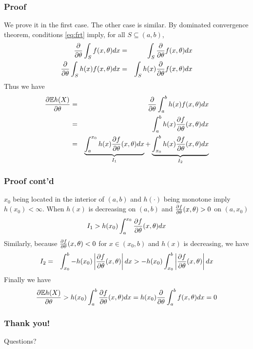 \documentclass{beamer}
\begin{document}
\begin{frame}
  \frametitle{Proof}
  \begin{scriptsize}
    We prove it in the first case. The other case is similar.
    By dominated convergence theorem, conditions \eqref{eq:frt}
    imply, for all $S \subseteq (a, b)$,
    \begin{eqnarray*}
      {\partial \over \partial \theta}\int_S f(x, \theta) dx
      &=&
      \int_S {\partial \over \partial \theta} f(x, \theta) dx \\
          {\partial \over \partial \theta}\int_S h(x) f(x, \theta) dx
          &=&
          \int_S h(x) {\partial \over \partial \theta} f(x, \theta) dx \\
    \end{eqnarray*}
    Thus we have
    \begin{eqnarray*}
      {\partial  \mathbb{E} h(X) \over \partial \theta}
      &=&
      {\partial \over \partial \theta}
      \int_a^b h(x)
      f(x, \theta) dx \\
      &=& \int_a^b h(x)
      {\partial f \over \partial \theta}(x, \theta) dx \\
      &=& \underbrace{\int_a^{x_0}
        h(x) {\partial f \over \partial \theta}(x, \theta) dx}_{I_1}
      + \underbrace{\int_{x_0}^b
        h(x) {\partial f \over \partial \theta}(x,
        \theta) dx}_{I_2}
    \end{eqnarray*}
  \end{scriptsize}
\end{frame}

\begin{frame}
  \frametitle{Proof cont'd}
  \begin{scriptsize}
    $x_0$ being located in the interior of $(a, b)$ and
    $h(\cdot)$ being monotone imply $h(x_0) < \infty$.
    When $h(x)$ is decreasing on $(a, b)$ and
    ${\partial f \over \partial \theta}(x, \theta) > 0$ on $(a, x_0)$
    \[
    I_1 > h(x_0) \int_a^{x_0}
    {\partial f \over \partial \theta}(x, \theta) dx
    \]
    Similarly, because
    ${\partial f \over \partial \theta}(x, \theta) < 0$ for
    $x \in (x_0, b)$ and $h(x)$ is decreasing, we have
    \begin{eqnarray*}
      I_2 &=& \int_{x_0}^b -h(x_0)
      \left|{\partial f \over \partial \theta}(x, \theta) \right| dx
      > -h(x_0)
      \int_{x_0}^b \left| 
          {\partial f \over \partial \theta}(x, \theta)
          \right| dx
    \end{eqnarray*}
    Finally we have
    \begin{eqnarray*}
      {\partial  \mathbb{E} h(X) \over \partial \theta}
      > h(x_0) \int_a^b
      {\partial f \over \partial \theta}(x, \theta) dx
      = h(x_0) {\partial \over \partial \theta}
      \int_a^b f(x, \theta) dx
      = 0
    \end{eqnarray*}
  \end{scriptsize}
\end{frame}

\begin{frame}
   \frametitle{Thank you!}
   Questions?
 \end{frame}


\end{document}
